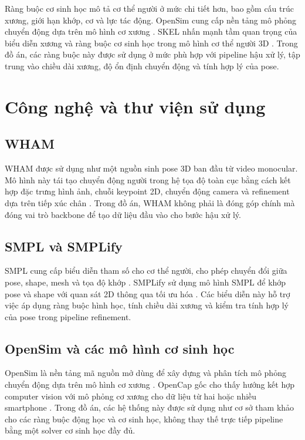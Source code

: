 \documentclass[../DoAn.tex]{subfiles}
\begin{document}
Ràng buộc cơ sinh học mô tả cơ thể người ở mức chi tiết hơn, bao gồm cấu trúc xương, giới hạn khớp, cơ và lực tác động. OpenSim cung cấp nền tảng mô phỏng chuyển động dựa trên mô hình cơ xương \cite{delp2007opensim}. SKEL nhấn mạnh tầm quan trọng của biểu diễn xương và ràng buộc cơ sinh học trong mô hình cơ thể người 3D \cite{keller2023skin}. Trong đồ án, các ràng buộc này được sử dụng ở mức phù hợp với pipeline hậu xử lý, tập trung vào chiều dài xương, độ ổn định chuyển động và tính hợp lý của pose.

\section{Công nghệ và thư viện sử dụng}
\label{sec:tech}

\subsection{WHAM}
WHAM được sử dụng như một nguồn sinh pose 3D ban đầu từ video monocular. Mô hình này tái tạo chuyển động người trong hệ tọa độ toàn cục bằng cách kết hợp đặc trưng hình ảnh, chuỗi keypoint 2D, chuyển động camera và refinement dựa trên tiếp xúc chân \cite{shin2024wham}. Trong đồ án, WHAM không phải là đóng góp chính mà đóng vai trò backbone để tạo dữ liệu đầu vào cho bước hậu xử lý.

\subsection{SMPL và SMPLify}
SMPL cung cấp biểu diễn tham số cho cơ thể người, cho phép chuyển đổi giữa pose, shape, mesh và tọa độ khớp \cite{smpl2015}. SMPLify sử dụng mô hình SMPL để khớp pose và shape với quan sát 2D thông qua tối ưu hóa \cite{smplify2016}. Các biểu diễn này hỗ trợ việc áp dụng ràng buộc hình học, tính chiều dài xương và kiểm tra tính hợp lý của pose trong pipeline refinement.

\subsection{OpenSim và các mô hình cơ sinh học}
OpenSim là nền tảng mã nguồn mở dùng để xây dựng và phân tích mô phỏng chuyển động dựa trên mô hình cơ xương \cite{opensim_software,delp2007opensim}. OpenCap gốc cho thấy hướng kết hợp computer vision với mô phỏng cơ xương cho dữ liệu từ hai hoặc nhiều smartphone \cite{uhlrich2023opencap}. Trong đồ án, các hệ thống này được sử dụng như cơ sở tham khảo cho các ràng buộc động học và cơ sinh học, không thay thế trực tiếp pipeline bằng một solver cơ sinh học đầy đủ.
\end{document}
